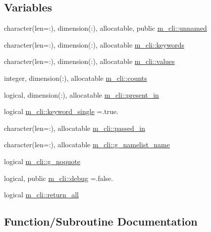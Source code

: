 \subsection*{Variables}
\begin{DoxyCompactItemize}
\item 
character(len=\+:), dimension(\+:), allocatable, public \mbox{\hyperlink{namespacem__cli_a7fd43837c254f34109d9f523c66c873a}{m\+\_\+cli\+::unnamed}}
\item 
character(len=\+:), dimension(\+:), allocatable \mbox{\hyperlink{namespacem__cli_a1eb7801692b3d6e25f16885fdf027f42}{m\+\_\+cli\+::keywords}}
\item 
character(len=\+:), dimension(\+:), allocatable \mbox{\hyperlink{namespacem__cli_aaec25aa63c2964c1125b9f14f27bf44a}{m\+\_\+cli\+::values}}
\item 
integer, dimension(\+:), allocatable \mbox{\hyperlink{namespacem__cli_ac6af3775222feedc5aff5874ce63897a}{m\+\_\+cli\+::counts}}
\item 
logical, dimension(\+:), allocatable \mbox{\hyperlink{namespacem__cli_ad08e57d14b3543d476d00e6bfda58fa5}{m\+\_\+cli\+::present\+\_\+in}}
\item 
logical \mbox{\hyperlink{namespacem__cli_a179ac9786afe3fe8474d97ac1a4f1d4c}{m\+\_\+cli\+::keyword\+\_\+single}} =.true.
\item 
character(len=\+:), allocatable \mbox{\hyperlink{namespacem__cli_aedc9f3e906ef523605292fd8cf8b00c0}{m\+\_\+cli\+::passed\+\_\+in}}
\item 
character(len=\+:), allocatable \mbox{\hyperlink{namespacem__cli_acd2598fd229b4b584315292251217c31}{m\+\_\+cli\+::g\+\_\+namelist\+\_\+name}}
\item 
logical \mbox{\hyperlink{namespacem__cli_a456bb87244997f19111533666a96b9eb}{m\+\_\+cli\+::g\+\_\+noquote}}
\item 
logical, public \mbox{\hyperlink{namespacem__cli_a83b45c240c1c7309a38c358ebcde28ec}{m\+\_\+cli\+::debug}} =.false.
\item 
logical \mbox{\hyperlink{namespacem__cli_a0320cf9d95b01ffbbd8f5a2e0d01ff26}{m\+\_\+cli\+::return\+\_\+all}}
\end{DoxyCompactItemize}


\subsection{Function/\+Subroutine Documentation}
\mbox{\label{M__CLI_8f90_aa26f90016621d1ee43d3b5b66316532b}} 
